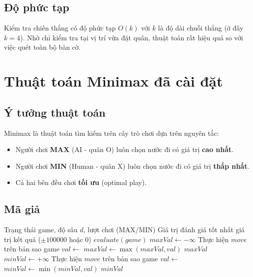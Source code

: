 \documentclass[12pt,a4paper]{article}
\begin{document}
\subsection{Độ phức tạp}

Kiểm tra chiến thắng có độ phức tạp $O(k)$ với $k$ là độ dài chuỗi thắng (ở đây $k = 4$). Nhờ chỉ kiểm tra tại vị trí vừa đặt quân, thuật toán rất hiệu quả so với việc quét toàn bộ bàn cờ.

\section{Thuật toán Minimax đã cài đặt}

\subsection{Ý tưởng thuật toán}

Minimax là thuật toán tìm kiếm trên cây trò chơi dựa trên nguyên tắc:
\begin{itemize}
    \item Người chơi \textbf{MAX} (AI - quân O) luôn chọn nước đi có giá trị \textbf{cao nhất}.
    \item Người chơi \textbf{MIN} (Human - quân X) luôn chọn nước đi có giá trị \textbf{thấp nhất}.
    \item Cả hai bên đều chơi \textbf{tối ưu} (optimal play).
\end{itemize}

\subsection{Mã giả}

\begin{algorithm}[H]
\caption{Thuật toán Minimax}
\begin{algorithmic}[1]
\Require Trạng thái game, độ sâu $d$, lượt chơi (MAX/MIN)
\Ensure Giá trị đánh giá tốt nhất
        \State \Return giá trị kết quả ($\pm 100000$ hoặc $0$)
    \EndIf
        \State \Return $evaluate(game)$ 
    \EndIf
        \State $maxVal \gets -\infty$
            \State Thực hiện $move$ trên bản sao game
            \State $val \gets$ 
            \State $maxVal \gets \max(maxVal, val)$
        \EndFor
        \State \Return $maxVal$
    \Else
        \State $minVal \gets +\infty$
            \State Thực hiện $move$ trên bản sao game
            \State $val \gets$ 
            \State $minVal \gets \min(minVal, val)$
        \EndFor
        \State \Return $minVal$
    \EndIf
\EndFunction
\end{algorithmic}
\end{algorithm}
\end{document}
